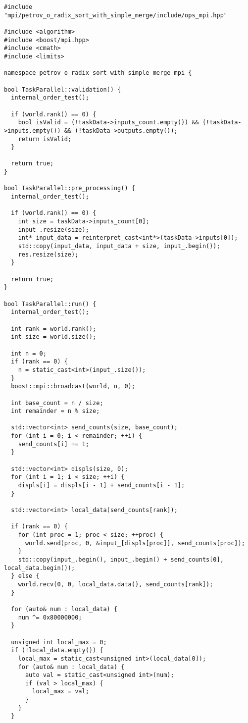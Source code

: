 \documentclass[12pt]{article}
\begin{document}
\begin{lstlisting}[caption={Параллельная версия поразрядной сортировки с использованием MPI}]
#include "mpi/petrov_o_radix_sort_with_simple_merge/include/ops_mpi.hpp"

#include <algorithm>
#include <boost/mpi.hpp>
#include <cmath>
#include <limits>

namespace petrov_o_radix_sort_with_simple_merge_mpi {

bool TaskParallel::validation() {
  internal_order_test();

  if (world.rank() == 0) {
    bool isValid = (!taskData->inputs_count.empty()) && (!taskData->inputs.empty()) && (!taskData->outputs.empty());
    return isValid;
  }

  return true;
}

bool TaskParallel::pre_processing() {
  internal_order_test();

  if (world.rank() == 0) {
    int size = taskData->inputs_count[0];
    input_.resize(size);
    int* input_data = reinterpret_cast<int*>(taskData->inputs[0]);
    std::copy(input_data, input_data + size, input_.begin());
    res.resize(size);
  }

  return true;
}

bool TaskParallel::run() {
  internal_order_test();

  int rank = world.rank();
  int size = world.size();

  int n = 0;
  if (rank == 0) {
    n = static_cast<int>(input_.size());
  }
  boost::mpi::broadcast(world, n, 0);

  int base_count = n / size;
  int remainder = n % size;

  std::vector<int> send_counts(size, base_count);
  for (int i = 0; i < remainder; ++i) {
    send_counts[i] += 1;
  }

  std::vector<int> displs(size, 0);
  for (int i = 1; i < size; ++i) {
    displs[i] = displs[i - 1] + send_counts[i - 1];
  }

  std::vector<int> local_data(send_counts[rank]);

  if (rank == 0) {
    for (int proc = 1; proc < size; ++proc) {
      world.send(proc, 0, &input_[displs[proc]], send_counts[proc]);
    }
    std::copy(input_.begin(), input_.begin() + send_counts[0], local_data.begin());
  } else {
    world.recv(0, 0, local_data.data(), send_counts[rank]);
  }

  for (auto& num : local_data) {
    num ^= 0x80000000;
  }

  unsigned int local_max = 0;
  if (!local_data.empty()) {
    local_max = static_cast<unsigned int>(local_data[0]);
    for (auto& num : local_data) {
      auto val = static_cast<unsigned int>(num);
      if (val > local_max) {
        local_max = val;
      }
    }
  }


\end{lstlisting}
\end{document}
